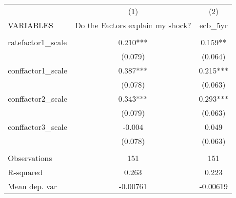 \documentclass[]{article}
\begin{document}
\begin{tabular}{lcc} \hline
 & (1) & (2) \\
VARIABLES & Do the Factors explain my shock? & ecb\_5yr \\ \hline
 &  &  \\
ratefactor1\_scale & 0.210*** & 0.159** \\
 & (0.079) & (0.064) \\
conffactor1\_scale & 0.387*** & 0.215*** \\
 & (0.078) & (0.063) \\
conffactor2\_scale & 0.343*** & 0.293*** \\
 & (0.079) & (0.063) \\
conffactor3\_scale & -0.004 & 0.049 \\
 & (0.078) & (0.063) \\
 &  &  \\
Observations & 151 & 151 \\
R-squared & 0.263 & 0.223 \\
 Mean dep. var & -0.00761 & -0.00619 \\ \hline
\end{tabular}
\end{document}
